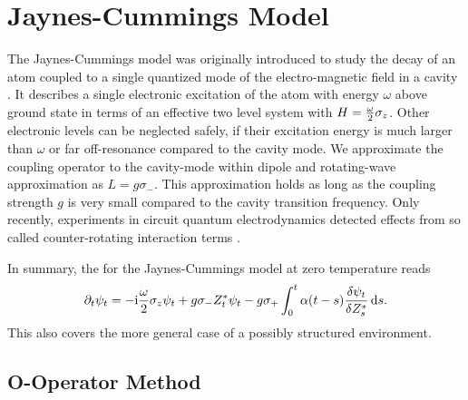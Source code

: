 \section{Jaynes-Cummings Model}
\label{sec:nmqsd.two_level}

%
The Jaynes-Cummings model was originally introduced to study the decay of an atom coupled to a single quantized mode of the electro-magnetic field in a cavity \cite{JaCu63_radiation_theory}.
It describes a single electronic excitation of the atom with energy $\omega$ above ground state in terms of an effective two level system with $H = \frac{\omega}{2}\sigma_z$.
Other electronic levels can be neglected safely, if their excitation energy is much larger than $\omega$ or far off-resonance compared to the cavity mode.
We approximate the coupling operator to the cavity-mode within dipole and rotating-wave approximation as $L = g\sigma_-$.
This approximation holds as long as the coupling strength $g$ is very small compared to the cavity transition frequency.
Only recently, experiments in circuit quantum electrodynamics detected effects from so called counter-rotating interaction terms \cite{NiDeHu10_circuit_qed}.

In summary, the \NMSSE for the Jaynes-Cummings model at zero temperature reads
\begin{equation}
  \partial_t \psi_t = -\mathrm{i}\frac{\omega}{2}\sigma_z\psi_t + g \sigma_- {Z}^*_t \psi_t - g\sigma_+ \int_0^t \alpha(t - s) \frac{\delta\psi_t}{\delta {Z}^*_s} \, \mathrm{d} s.
  \label{eq:nmqsd.nmsse_twolevel}
\end{equation}
This also covers the more general case of a possibly structured environment.


\subsection{O-Operator Method}
\label{sub:nmqsd.two_level.o}
%

